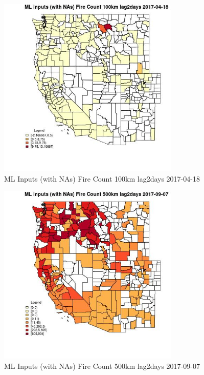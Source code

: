 \begin{figure} 
\centering  
\includegraphics[width=0.77\textwidth]{Code_Outputs/Report_ML_input_PM25_Step4_part_e_de_duplicated_aves_compiled_2019-05-20wNAs_CountyFire_Count_100km_lag2daysMean2017-04-18.jpg} 
\caption{\label{fig:Report_ML_input_PM25_Step4_part_e_de_duplicated_aves_compiled_2019-05-20wNAsCountyFire_Count_100km_lag2daysMean2017-04-18}ML Inputs (with NAs) Fire Count 100km lag2days 2017-04-18} 
\end{figure} 
 

\begin{figure} 
\centering  
\includegraphics[width=0.77\textwidth]{Code_Outputs/Report_ML_input_PM25_Step4_part_e_de_duplicated_aves_compiled_2019-05-20wNAs_CountyFire_Count_500km_lag2daysMean2017-09-07.jpg} 
\caption{\label{fig:Report_ML_input_PM25_Step4_part_e_de_duplicated_aves_compiled_2019-05-20wNAsCountyFire_Count_500km_lag2daysMean2017-09-07}ML Inputs (with NAs) Fire Count 500km lag2days 2017-09-07} 
\end{figure} 
 

